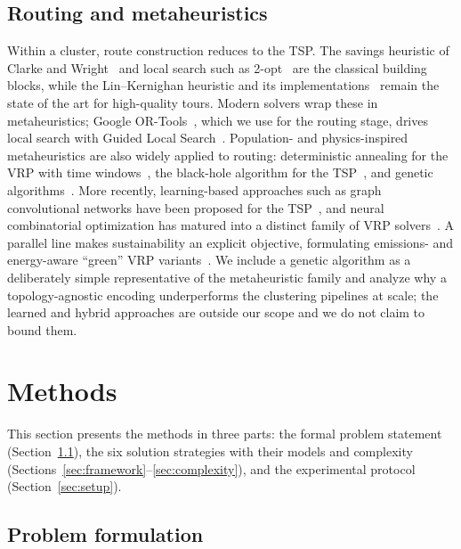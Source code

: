 \documentclass[runningheads]{llncs}
\begin{document}
\subsection{Routing and metaheuristics}
Within a cluster, route construction reduces to the TSP. The savings
heuristic of Clarke and Wright~\cite{ClarkeWright1964Savings} and local
search such as 2-opt~\cite{Croes1958TwoOpt} are the classical building
blocks, while the Lin--Kernighan heuristic and its
implementations~\cite{HelsgaunAnHeuristic} remain the state of the art
for high-quality tours. Modern solvers wrap these in metaheuristics;
Google OR-Tools~\cite{PerronFurnon2023ORTools}, which we use for the
routing stage, drives local search with Guided Local
Search~\cite{Voudouris1999GLS}. Population- and physics-inspired
metaheuristics are also widely applied to routing: deterministic
annealing for the VRP with time windows~\cite{Baranwal2016DAVRPTW},
the black-hole algorithm for the TSP~\cite{Hatamlou2018BlackHole}, and
genetic algorithms~\cite{Holland1992Adaptation}. More recently,
learning-based approaches such as graph convolutional networks have
been proposed for the TSP~\cite{Joshi2019GCN,Dahiya2018TSPReview}, and
neural combinatorial optimization has matured into a distinct family of
VRP solvers~\cite{Wu2024NCOSurvey}. A parallel line makes
sustainability an explicit objective, formulating emissions- and
energy-aware ``green'' VRP variants~\cite{Sabet2022GreenVRP}. We include a
genetic algorithm as a deliberately simple representative of the
metaheuristic family and analyze why a topology-agnostic encoding
underperforms the clustering pipelines at scale; the learned and hybrid
approaches are outside our scope and we do not claim to bound them.

\section{Methods}\label{sec:methods}
This section presents the methods in three parts: the formal problem
statement (Section~\ref{sec:problem}), the six solution strategies with
their models and complexity (Sections~\ref{sec:framework}--\ref{sec:complexity}),
and the experimental protocol (Section~\ref{sec:setup}).

\subsection{Problem formulation}\label{sec:problem}
\end{document}
